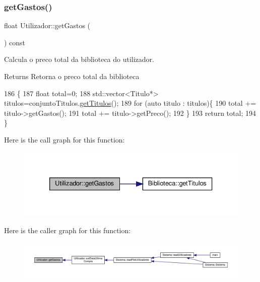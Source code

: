 \subsubsection{\texorpdfstring{get\+Gastos()}{getGastos()}}
{\footnotesize\ttfamily float Utilizador\+::get\+Gastos (\begin{DoxyParamCaption}{ }\end{DoxyParamCaption}) const}



Calcula o preco total da biblioteca do utilizador. 

\begin{DoxyReturn}{Returns}
Retorna o preco total da biblioteca 
\end{DoxyReturn}

\begin{DoxyCode}
186                                  \{
187     \textcolor{keywordtype}{float} total=0;
188     std::vector<Titulo*> titulos=conjuntoTitulos.\hyperlink{classBiblioteca_a03c1ebf76a4ace4f57000bb99a87bb88}{getTitulos}();
189     \textcolor{keywordflow}{for} (\textcolor{keyword}{auto} titulo : titulos)\{
190         total += titulo->getGastos();
191         total += titulo->getPreco();
192     \}
193     \textcolor{keywordflow}{return} total;
194 \}
\end{DoxyCode}
Here is the call graph for this function\+:
\nopagebreak
\begin{figure}[H]
\begin{center}
\leavevmode
\includegraphics[width=333pt]{classUtilizador_a2fc6ea78068d43766a6bc344a3059f61_cgraph}
\end{center}
\end{figure}
Here is the caller graph for this function\+:
\nopagebreak
\begin{figure}[H]
\begin{center}
\leavevmode
\includegraphics[width=350pt]{classUtilizador_a2fc6ea78068d43766a6bc344a3059f61_icgraph}
\end{center}
\end{figure}
\mbox{\label{classUtilizador_adff93f098f9512263fcbd1cdadf20855}} 
